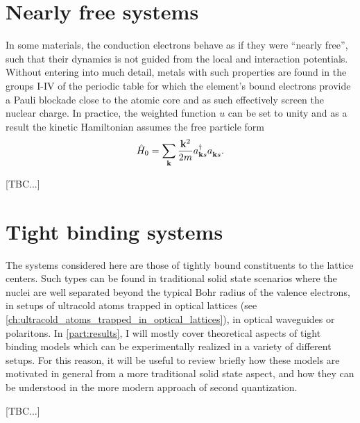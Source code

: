 \section{Nearly free systems}
\label{sec:nearly_free_systems}
In some materials, the conduction electrons behave as if they were ``nearly free'', such that their dynamics is not guided from the local and interaction potentials.
Without entering into much detail, metals with such properties are found in the groups I-IV of the periodic table for which the element's bound electrons provide a Pauli blockade close to the atomic core and as such effectively screen the nuclear charge.
In practice, the weighted function $u$ can be set to unity and as a result the kinetic Hamiltonian assumes the free particle form
\begin{align}
    \hat H_0 = \sum_{\bf k}\frac{{\bf k}^2}{2m}a^\dag_{{\bf k}s}a^\pdag_{{\bf k}s}.
\end{align}

[TBC...]
%
%
\section{Tight binding systems}
\label{sec:tight_binding_systems}
The systems considered here are those of tightly bound constituents to the lattice centers.
Such types can be found in traditional solid state scenarios where the nuclei are well separated beyond the typical Bohr radius of the valence electrons, in setups of ultracold atoms trapped in optical lattices (see \cref{ch:ultracold_atoms_trapped_in_optical_lattices}), in optical waveguides or polaritons.
In \cref{part:results}, I will mostly cover theoretical aspects of tight binding models which can be experimentally realized in a variety of different setups.
For this reason, it will be useful to review briefly how these models are motivated in general from a more traditional solid state aspect, and how they can be understood in the more modern approach of second quantization.

[TBC...]
%
%
